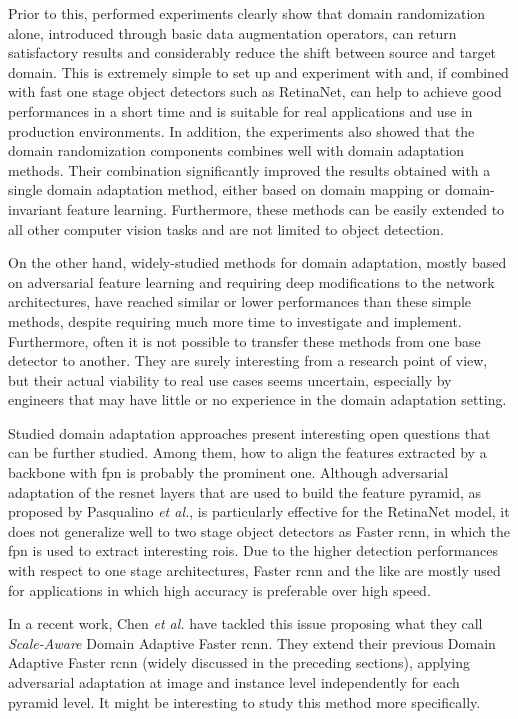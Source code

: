 \documentclass[%
    corpo=12pt,
    twoside,
    stile=classica,   
    tipotesi=magistrale,
    evenboxes,
    english,
	numerazioneromana,
]{toptesi}
\begin{document}
Prior to this, performed experiments clearly show that domain randomization alone, introduced through basic data augmentation operators, can return satisfactory results and considerably reduce the shift between source and target domain. This is extremely simple to set up and experiment with and, if combined with fast one stage object detectors such as RetinaNet, can help to achieve good performances in a short time and is suitable for real applications and use in production environments. In addition, the experiments also showed that the domain randomization components combines well with domain adaptation methods. Their combination significantly improved the results obtained with a single domain adaptation method, either based on domain mapping or domain-invariant feature learning. Furthermore, these methods can be easily extended to all other computer vision tasks and are not limited to object detection.

On the other hand, widely-studied methods for domain adaptation, mostly based on adversarial feature learning and requiring deep modifications to the network architectures, have reached similar or lower performances than these simple methods, despite requiring much more time to investigate and implement. Furthermore, often it is not possible to transfer these methods from one base detector to another. They are surely interesting from a research point of view, but their actual viability to real use cases seems uncertain, especially by engineers that may have little or no experience in the domain adaptation setting.

\bigskip
Studied domain adaptation approaches present interesting open questions that can be further studied. Among them, how to align the features extracted by a backbone with \gls{fpn} is probably the prominent one. Although adversarial adaptation of the \gls{resnet} layers that are used to build the feature pyramid, as proposed by Pasqualino \textit{et al.}\cite{pasqualino2020unsupervised}, is particularly effective for the RetinaNet model, it does not generalize well to two stage object detectors as Faster \gls{rcnn}, in which the \gls{fpn} is used to extract interesting \glspl{roi}. Due to the higher detection performances with respect to one stage architectures, Faster \gls{rcnn} and the like are mostly used for applications in which high accuracy is preferable over high speed.

In a recent work, Chen \textit{et al.} have tackled this issue proposing what they call \textit{Scale-Aware} Domain Adaptive Faster \gls{rcnn}\cite{chen2021scale}. They extend their previous Domain Adaptive Faster \gls{rcnn} (widely discussed in the preceding sections), applying adversarial adaptation at image and instance level independently for each pyramid level. It might be interesting to study this method more specifically.
\end{document}
